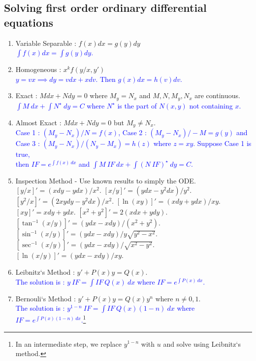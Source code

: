 \subsection{Solving first order ordinary differential equations}
\begin{enumerate}
	\item Variable Separable : $f(x)dx = g(y)dy$\\ 
	\textcolor{blue}{$\int f(x) dx = \int g(y) dy$.}
	\item Homogeneous : $x^k f(y/x,y')$ \\ 
	\textcolor{blue}{$y= vx \implies dy = vdx + xdv$. Then $g(x)dx = h(v)dv$.}
	\item Exact : $Mdx + Ndy = 0$ where $M_y = N_x$ and $M,N,M_y,N_x$ are continuous.\\
	\textcolor{blue}{$\int M\ dx + \int N^\star\ dy = C$ where $N^\star$ is the part of $N(x,y)$ not containing $x$.}
	\item Almost Exact : $Mdx + Ndy = 0$ but $M_y \ne N_x$. \\
		\textcolor{blue}{Case 1 : $(M_y - N_x)/N = f(x)$, Case 2 : $(M_y-N_x)/-M = g(y)$ and\\ Case 3 : $(M_y - N_x)/(N_y - M_x) = h(z)$ where $z = xy$.
		Suppose Case 1 is true,\\ then $I\!F = e^{\int f(x)\ dx}$ and $\int M\ I\!F\ dx + \int (N\ I\!F)^\star\ dy = C$.}
	\item Inspection Method - Use known results to simply the ODE.
		{\color{blue}
		\subitem $[y/x]' = (xdy - ydx)/x^2$.
		\subitem $[x/y]' = (ydx - y^2dx)/y^2$.
		\subitem $[y^2/x]' = (2xydy - y^2dx)/x^2$.
		\subitem $[\ln(xy)]' = (xdy+ydx)/xy$.
		\subitem $[xy]' = xdy + ydx$.
		\subitem $[x^2+y^2]' = 2(xdx + ydy)$.
		\subitem $[\tan^{-1} (x/y)]' = (ydx-xdy)/(x^2+y^2)$.
		\subitem $[\sin^{-1} (x/y)]' = (ydx-xdy)/y\sqrt{y^2-x^2}$.
		\subitem $[\sec^{-1} (x/y)]' = (ydx-xdy)/\sqrt{x^2-y^2}$.
		\subitem $[\ln(x/y)]' = (ydx-xdy)/xy$.
		}
	\item Leibnitz`s Method : $y'+P(x)y = Q(x)$.\\ 
	\textcolor{blue}{The solution is : $y\ I\!F = \int I\!F\ Q(x)\ dx$ where $I\!F = e^{\int P(x)\ dx}$.}
	\item Bernouli`s Method : $y'+P(x)y = Q(x)y^n$ where $n \ne 0,1$.\\ 
	\textcolor{blue}{The solution is : $y^{1-n}\ I\!F = \int I\!F\ Q(x)(1-n)\ dx$ where $I\!F = e^{\int P(x)(1-n)\ dx}$.\footnote{In an intermediate step, we replace $y^{1-n}$ with $u$ and solve using Leibnitz`s method.}}
\end{enumerate}
